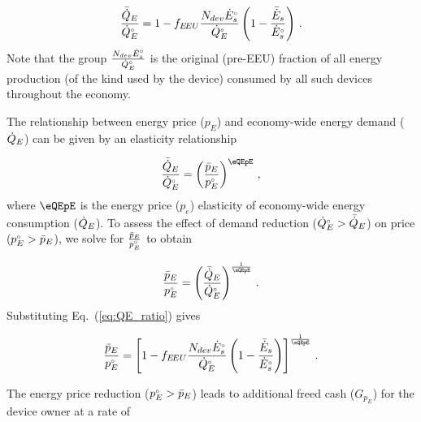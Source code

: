 \begin{equation} \label{eq:QE_ratio}
  \frac{\bar{\dot{Q}}_E}{{}{\dot{Q}}^{\scriptscriptstyle \circ}_E} =
        1 - f_{E\!EU} \frac{N_{dev} {}{\dot{E}}^{\scriptscriptstyle \circ}_s}{{}{\dot{Q}}^{\scriptscriptstyle \circ}_E} \left( 1 - \frac{\bar{\dot{E}}_s}{{}{\dot{E}}^{\scriptscriptstyle \circ}_s}  \right) \, .
\end{equation}
%
Note that the group $\frac{N_{dev} {}{\dot{E}}^{\scriptscriptstyle \circ}_s}{{}{\dot{Q}}^{\scriptscriptstyle \circ}_E}$
is the original (pre-EEU) fraction of all energy production
(of the kind used by the device)
consumed by all such devices throughout the economy.

The relationship between energy price ($p_E$) and
economy-wide energy demand ($\dot{Q}_E$)
can be given by an elasticity relationship

\begin{equation}
  \frac{\rainc{Q}_E}{\rorig{Q}_E} = 
          \left( \frac{\ainc{p}_E}{\orig{p}_E} \right)^{\eQEpE} \, ,
\end{equation}
%
where $\eQEpE$ is the energy price ($p_e$) elasticity
of economy-wide energy consumption ($\dot{Q}_E$).
To assess the effect of demand reduction
(${}{\dot{Q}}^{\scriptscriptstyle \circ}_E > \bar{\dot{Q}}_E$)
on price
(${}{p}^{\scriptscriptstyle \circ}_E > \bar{p}_E$),
we solve for $\frac{\bar{p}_E}{{}{p}^{\scriptscriptstyle \circ}_E}$
to obtain

\begin{equation}
  \frac{\ainc{p}_E}{\orig{p}_E} =
        \left( \frac{\rainc{Q}_E}{\rorig{Q}_E} \right)^{\frac{1}{\eQEpE}} \, .
\end{equation}
%
Substituting Eq.~(\ref{eq:QE_ratio}) gives

\begin{equation} \label{eq:price_effect_price_ratio}
  \frac{\ainc{p}_E}{\orig{p}_E} =
        \left[ 1 - f_{\EEU} \frac{N_{dev} \rbempl{E}_s}{\rbempl{Q}_E} \left( 1 - \frac{\rainc{E}_s}{\rbempl{E}_s}  \right) \right]^{\frac{1}{\eQEpE}} \, .
\end{equation}

The energy price reduction (${}{p}^{\scriptscriptstyle \circ}_E > \bar{p}_E$)
leads to additional freed cash ($G_{p_E}$) 
for the device owner at a rate of

